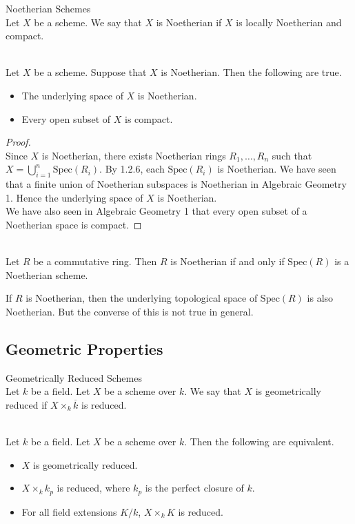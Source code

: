 \documentclass[a4paper]{article}
\begin{document}
\begin{defn}{Noetherian Schemes}{}\\
Let $X$ be a scheme. We say that $X$ is Noetherian if $X$ is locally Noetherian and compact. 
\end{defn}

\begin{lmm}{}{}\\
Let $X$ be a scheme. Suppose that $X$ is Noetherian. Then the following are true. 
\begin{itemize}
\item The underlying space of $X$ is Noetherian. 
\item Every open subset of $X$ is compact. 
\end{itemize}
\begin{proof}\\
Since $X$ is Noetherian, there exists Noetherian rings $R_1,\dots,R_n$ such that $X=\bigcup_{i=1}^n\text{Spec}(R_i)$. By 1.2.6, each $\text{Spec}(R_i)$ is Noetherian. We have seen that a finite union of Noetherian subspaces is Noetherian in Algebraic Geometry 1. Hence the underlying space of $X$ is Noetherian. \\

We have also seen in Algebraic Geometry 1 that every open subset of a Noetherian space is compact. 
\end{proof}
\end{lmm}

\begin{lmm}{}{}\\
Let $R$ be a commutative ring. Then $R$ is Noetherian if and only if $\text{Spec}(R)$ is a Noetherian scheme. 
\end{lmm}

If $R$ is Noetherian, then the underlying topological space of $\text{Spec}(R)$ is also Noetherian. But the converse of this is not true in general. 

\subsection{Geometric Properties}
\begin{defn}{Geometrically Reduced Schemes}{}\\
Let $k$ be a field. Let $X$ be a scheme over $k$. We say that $X$ is geometrically reduced if $X\times_k\overline{k}$ is reduced. 
\end{defn}

\begin{prp}{}{}\\
Let $k$ be a field. Let $X$ be a scheme over $k$. Then the following are equivalent. 
\begin{itemize}
\item $X$ is geometrically reduced. 
\item $X\times_kk_p$ is reduced, where $k_p$ is the perfect closure of $k$. 
\item For all field extensions $K/k$, $X\times_kK$ is reduced. 
\end{itemize}
\end{prp}
\end{document}
